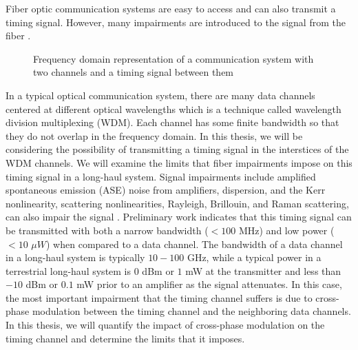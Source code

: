 Fiber optic communication systems are easy to access and can also transmit a timing signal. However, many impairments are introduced to the signal from the fiber \cite{agrawal2012fiber}.  

\begin{figure}[h!]
\label{fig:commfreq}
\centering
{}
\caption{\label{fig:datatiming}Frequency domain representation of a communication system with two channels and a timing signal between them}
\end{figure}

In a typical optical communication system, there are many data channels centered at different optical wavelengths which is a technique called wavelength division multiplexing (WDM).  Each channel has some finite bandwidth so that they do not overlap in the frequency domain.  In this thesis, we will be considering the possibility of transmitting a timing signal in the interstices of the WDM channels.  We will examine the limits that fiber impairments impose on this timing signal in a long-haul system.  Signal impairments include amplified spontaneous emission (ASE) noise from amplifiers, dispersion, and the Kerr nonlinearity, scattering nonlinearities, Rayleigh, Brillouin, and Raman scattering, can also impair the signal \cite{agrawal2012fiber}\cite{agrawal1995nonlinear}.  Preliminary work indicates that this timing signal can be transmitted with both a narrow bandwidth ($< 100$ MHz) and low power ($<10$ $\mu W$) when compared to a data channel.  The bandwidth of a data channel in a long-haul system is typically $10-100$ GHz, while a typical power in a terrestrial long-haul system is $0$ dBm or $1$ mW at the transmitter and less than $-10$ dBm or $0.1$ mW prior to an amplifier as the signal attenuates.  In this case, the most important impairment that the timing channel suffers is due to cross-phase modulation between the timing channel and the neighboring data channels.  In this thesis, we will quantify the impact of cross-phase modulation on the timing channel and determine the limits that it imposes.


